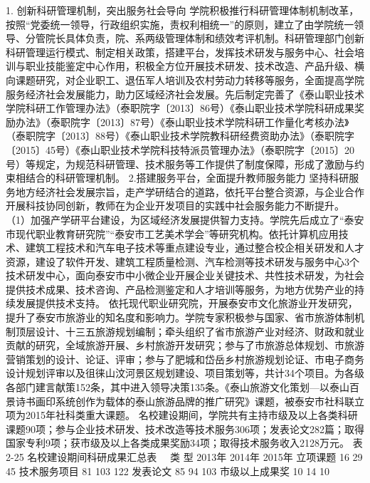 1. 创新科研管理机制，突出服务社会导向
学院积极推行科研管理体制机制改革，按照“党委统一领导，行政组织实施，责权利相统一”的原则，建立了由学院统一领导、分管院长具体负责，院、系两级管理体制和绩效考评机制。科研管理部门创新科研管理运行模式、制定相关政策，搭建平台，发挥技术研发与服务中心、社会培训与职业技能鉴定中心作用，积极全方位开展技术研发、技术改造、产品升级、横向课题研究，对企业职工、退伍军人培训及农村劳动力转移等服务，全面提高学院服务经济社会发展能力，助力区域经济社会发展。先后制定完善了《泰山职业技术学院科研工作管理办法》（泰职院字〔2013〕86号）《泰山职业技术学院科研成果奖励办法》（泰职院字〔2013〕87号）《泰山职业技术学院科研工作量化考核办法》（泰职院字〔2013〕88号）《泰山职业技术学院教科研经费资助办法》（泰职院字〔2015〕45号）《泰山职业技术学院科技特派员管理办法》（泰职院字〔2015〕20号）等规定，为规范科研管理、技术服务等工作提供了制度保障，形成了激励与约束相结合的科研管理机制。
2.搭建服务平台，全面提升教师服务能力
坚持科研服务地方经济社会发展宗旨，走产学研结合的道路，依托平台整合资源，与企业合作开展科技协同创新，教师在为企业开发项目的实践中社会服务能力不断提升。
（1）加强产学研平台建设，为区域经济发展提供智力支持。学院先后成立了“泰安市现代职业教育研究院”“泰安市工艺美术学会”等研究机构。依托计算机应用技术、建筑工程技术和汽车电子技术等重点建设专业，通过整合校企相关研发和人才资源，建设了软件开发、建筑工程质量检测、汽车检测等技术研发与服务中心3个技术研发中心，面向泰安市中小微企业开展企业关键技术、共性技术研发，为社会提供技术成果、技术咨询、产品检测鉴定和人才培训等服务，为地方优势产业的持续发展提供技术支持。
依托现代职业研究院，开展泰安市文化旅游业开发研究，提升了泰安市旅游业的知名度和影响力。学院专家积极参与国家、省市旅游体制机制顶层设计、十三五旅游规划编制；牵头组织了省市旅游产业对经济、财政和就业贡献的研究，全域旅游开展、乡村旅游开发研究；参与了市旅游总体规划、市旅游营销策划的设计、论证、评审；参与了肥城和岱岳乡村旅游规划论证、市电子商务设计规划评审以及徂徕山汶河景区规划建设、项目策划等，共计34个项目。为各级各部门建言献策152条，其中进入领导决策135条。《泰山旅游文化策划—以泰山百景诗书画印系统创作为载体的泰山旅游品牌的推广研究》课题，被泰安市社科联立项为2015年社科类重大课题。
名校建设期间，学院共有主持市级及以上各类科研课题90项；参与企业技术研发、技术改造等技术服务306项；发表论文282篇；取得国家专利9项；获市级及以上各类成果奖励34项；取得技术服务收入2128万元。
表2-25 名校建设期间科研成果汇总表
　类    型
2013年
2014年
2015年
立项课题
16
29
45
技术服务项目
81
103
122
发表论文
85
94
103
市级以上成果奖
10
14
10

